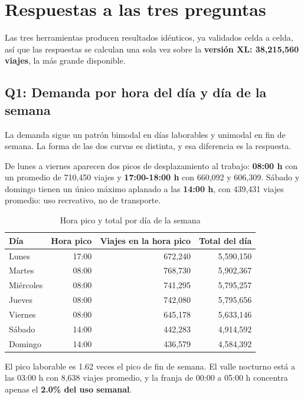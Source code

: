\section{Respuestas a las tres preguntas}
\label{sec:respuestas}

Las tres herramientas producen resultados idénticos, ya validados celda a celda, así que las respuestas se calculan una sola vez sobre la \textbf{versión XL: 38,215,560 viajes}, la más grande disponible.

\subsection{Q1: Demanda por hora del día y día de la semana}

La demanda sigue un patrón bimodal en días laborables y unimodal en fin de semana. La forma de las dos curvas es distinta, y esa diferencia es la respuesta.

De lunes a viernes aparecen dos picos de desplazamiento al trabajo: \textbf{08:00 h} con un promedio de 710,450 viajes y \textbf{17:00-18:00 h} con 660,092 y 606,309. Sábado y domingo tienen un único máximo aplanado a las \textbf{14:00 h}, con 439,431 viajes promedio: uso recreativo, no de transporte.

\begin{table}[htbp]
\centering
\caption{Hora pico y total por día de la semana}
\label{tab:q1-picos}
\begin{tabular}{lrrr}
\toprule
Día & Hora pico & Viajes en la hora pico & Total del día \\
\midrule
Lunes     & 17:00 & 672,240 & 5,590,150 \\
Martes    & 08:00 & 768,730 & 5,902,367 \\
Miércoles & 08:00 & 741,295 & 5,795,257 \\
Jueves    & 08:00 & 742,080 & 5,795,656 \\
Viernes   & 08:00 & 645,178 & 5,633,146 \\
Sábado    & 14:00 & 442,283 & 4,914,592 \\
Domingo   & 14:00 & 436,579 & 4,584,392 \\
\bottomrule
\end{tabular}
\end{table}

El pico laborable es 1.62 veces el pico de fin de semana. El valle nocturno está a las 03:00 h con 8,638 viajes promedio, y la franja de 00:00 a 05:00 h concentra apenas el \textbf{2.0\% del uso semanal}.

